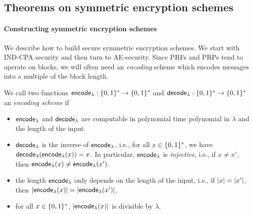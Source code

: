 \subsection{Theorems on symmetric encryption schemes}
\paragraph{Constructing symmetric encryption schemes}
We describe how to build secure symmetric encryption schemes. We start with IND-CPA security
and then turn to AE-security. Since PRFs and PRPs tend to operate on blocks, we will often
need an \emph{encoding} scheme which encodes messages into a multiple of the block length.
\begin{definition}
We call two functions $\mathsf{encode}_\lambda:\{0,1\}^*\rightarrow\{0,1\}^*$ and $\mathsf{decode}_\lambda:\{0,1\}^*\rightarrow\{0,1\}^*$
an \emph{encoding scheme} if
\begin{itemize}
\item $\mathsf{encode}_\lambda$ and $\mathsf{decode}_\lambda$ are computable in polynomial time polynomial in $\lambda$ and the length of the input.
\item $\mathsf{decode}_\lambda$ is the inverse of $\mathsf{encode}_\lambda$, i.e., for all $x\in\{0,1\}^*$, we have
      $\mathsf{decode}_\lambda(\mathsf{encode}_\lambda(x))=x$. In particular, $\mathsf{encode}_\lambda$ is \emph{injective}, i.e., if $x\neq x'$, then $\mathsf{encode}_\lambda(x)\neq\mathsf{encode}_\lambda(x')$.
\item the length $\mathsf{encode}_\lambda$ only depends on the length of the input, i.e., if $\left\lvert x\right\rvert=\left\lvert x'\right\rvert$, then 
$\left\lvert\mathsf{encode}_\lambda(x)\right\rvert=\left\lvert\mathsf{encode}_\lambda(x')\right\rvert$.
\item for all $x\in\{0,1\}^*$, $\left\lvert\mathsf{encode}_\lambda(x)\right\rvert$ is divisible by $\lambda$.
\end{itemize}
\end{definition}

